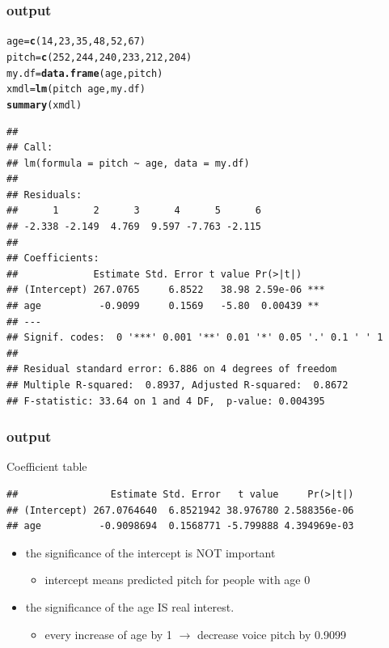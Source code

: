 \documentclass[10p]{beamer}\usepackage[]{graphicx}\usepackage[]{color}
\makeatletter
\newcommand{\hlnum}[1]{\textcolor[rgb]{0.686,0.059,0.569}{#1}}%
\newcommand{\hlopt}[1]{\textcolor[rgb]{0,0,0}{#1}}%
\newcommand{\hlstd}[1]{\textcolor[rgb]{0.345,0.345,0.345}{#1}}%
\newcommand{\hlkwb}[1]{\textcolor[rgb]{0.69,0.353,0.396}{#1}}%
\newcommand{\hlkwd}[1]{\textcolor[rgb]{0.737,0.353,0.396}{\textbf{#1}}}%
\newenvironment{kframe}{%
 \def\at@end@of@kframe{}%
 \ifinner\ifhmode%
  \def\at@end@of@kframe{\end{minipage}}%
  \begin{minipage}{\columnwidth}%
 \fi\fi%
 \def\FrameCommand##1{\hskip\@totalleftmargin \hskip-\fboxsep
 \colorbox{shadecolor}{##1}\hskip-\fboxsep
     \hskip-\linewidth \hskip-\@totalleftmargin \hskip\columnwidth}%
 \MakeFramed {\advance\hsize-\width
   \@totalleftmargin\z@ \linewidth\hsize
   \@setminipage}}%
 {\par\unskip\endMakeFramed%
 \at@end@of@kframe}
\newenvironment{knitrout}{}{} %
\makeatother
\begin{document}
\begin{frame}[fragile]
\frametitle{output}
\begin{knitrout}\tiny
{}\color{fgcolor}\begin{kframe}
\begin{alltt}
\hlstd{age} \hlkwb{=} \hlkwd{c}\hlstd{(}\hlnum{14}\hlstd{,}\hlnum{23}\hlstd{,}\hlnum{35}\hlstd{,}\hlnum{48}\hlstd{,}\hlnum{52}\hlstd{,}\hlnum{67}\hlstd{)}
\hlstd{pitch} \hlkwb{=} \hlkwd{c}\hlstd{(}\hlnum{252}\hlstd{,}\hlnum{244}\hlstd{,}\hlnum{240}\hlstd{,}\hlnum{233}\hlstd{,}\hlnum{212}\hlstd{,}\hlnum{204}\hlstd{)}
\hlstd{my.df} \hlkwb{=} \hlkwd{data.frame}\hlstd{(age, pitch)}
\hlstd{xmdl} \hlkwb{=} \hlkwd{lm}\hlstd{(pitch}\hlopt{~}\hlstd{age, my.df)}
\hlkwd{summary}\hlstd{(xmdl)}
\end{alltt}
\begin{verbatim}
## 
## Call:
## lm(formula = pitch ~ age, data = my.df)
## 
## Residuals:
##      1      2      3      4      5      6 
## -2.338 -2.149  4.769  9.597 -7.763 -2.115 
## 
## Coefficients:
##             Estimate Std. Error t value Pr(>|t|)    
## (Intercept) 267.0765     6.8522   38.98 2.59e-06 ***
## age          -0.9099     0.1569   -5.80  0.00439 ** 
## ---
## Signif. codes:  0 '***' 0.001 '**' 0.01 '*' 0.05 '.' 0.1 ' ' 1
## 
## Residual standard error: 6.886 on 4 degrees of freedom
## Multiple R-squared:  0.8937,	Adjusted R-squared:  0.8672 
## F-statistic: 33.64 on 1 and 4 DF,  p-value: 0.004395
\end{verbatim}
\end{kframe}
\end{knitrout}
\end{frame}

\begin{frame}[fragile]
\frametitle{output}
Coefficient table
\begin{knitrout}\scriptsize
{}\color{fgcolor}\begin{kframe}
\begin{verbatim}
##                Estimate Std. Error   t value     Pr(>|t|)
## (Intercept) 267.0764640  6.8521942 38.976780 2.588356e-06
## age          -0.9098694  0.1568771 -5.799888 4.394969e-03
\end{verbatim}
\end{kframe}
\end{knitrout}
\begin{itemize}
\item the significance of the intercept is NOT important
	\begin{itemize}
	\item intercept means predicted pitch for people with age 0
	\end{itemize}
\item the significance of the age IS real interest.
	\begin{itemize}
	\item every increase of age by 1 $\rightarrow$ decrease voice pitch by 0.9099
	\end{itemize}

\end{itemize}
\end{frame}
\end{document}
